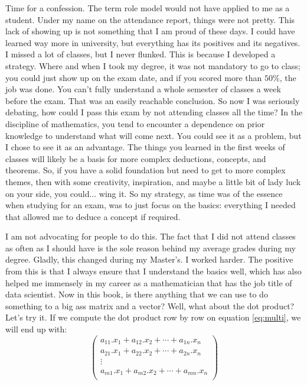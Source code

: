 \documentclass[a4,12pt,twosided,openany]{memoir}
\begin{document}
Time for a confession. The term role model would not have applied to me as a student. Under my name on the attendance report, things were not pretty. This lack of showing up is not something that I am proud of these days. I could have learned way more in university, but everything has its positives and its negatives. I missed a lot of classes, but I never flunked. This is because I developed a strategy. Where and when I took my degree, it was not mandatory to go to class; you could just show up on the exam date, and if you scored more than $50\%$, the job was done. You can’t fully understand a whole semester of classes a week before the exam. That was an easily reachable conclusion. So now I was seriously debating, how could I pass this exam by not attending classes all the time? In the discipline of mathematics, you tend to encounter a dependence on prior knowledge to understand what will come next. You could see it as a problem, but I chose to see it as an advantage. The things you learned in the first weeks of classes will likely be a basis for more complex deductions, concepts, and theorems. So, if you have a solid foundation but need to get to more complex themes, then with some creativity, inspiration, and maybe a little bit of lady luck on your side, you could... wing it. So my strategy, as time was of the essence when studying for an exam, was to just focus on the basics: everything I needed that allowed me to deduce a concept if required.
\par 
\indent
I am not advocating for people to do this. The fact that I did not attend classes as often as I should have is the sole reason behind my average grades during my degree. Gladly, this changed during my Master’s. I worked harder. The positive from this is that I always ensure that I understand the basics well, which has also helped me immensely in my career as a mathematician that has the job title of data scientist. Now in this book, is there anything that we can use to do something to a big ass matrix and a vector? Well, what about the dot product? Let’s try it. If we compute the dot product row by row on equation \ref{eq:multi}, we will end up with:
\[\begin{pmatrix}
a_{11}.x_1 + a_{12}.x_2 + \cdots + a_{1n}.x_n\\
a_{21}.x_1 + a_{22}.x_2  + \cdots + a_{2n}.x_n\\
\vdots \\
a_{m1}.x_1 + a_{m2}.x_2  + \cdots + a_{mn}.x_n\\
\end{pmatrix} 
\]
\end{document}
